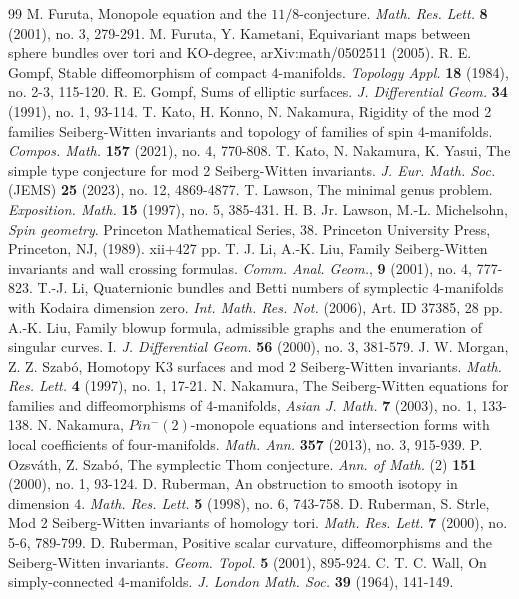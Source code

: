 \documentclass{amsart}
\theoremstyle{definition}
\theoremstyle{remark}
\numberwithin{equation}{section}
\begin{document}
\begin{thebibliography}{99}
M. Furuta, Monopole equation and the $11/8$-conjecture. {\em Math. Res. Lett.} {\bf 8} (2001), no. 3, 279-291. 
M. Furuta, Y. Kametani, Equivariant maps between sphere bundles over tori and KO-degree, arXiv:math/0502511 (2005).
R. E. Gompf, Stable diffeomorphism of compact $4$-manifolds. {\em Topology Appl.} {\bf 18} (1984), no. 2-3, 115-120. 
R. E. Gompf, Sums of elliptic surfaces. {\em J. Differential Geom.} {\bf 34} (1991), no. 1, 93-114. 
T. Kato, H. Konno, N. Nakamura, Rigidity of the mod 2 families Seiberg-Witten invariants and topology of families of spin 4-manifolds. {\em Compos. Math.} {\bf 157} (2021), no. 4, 770-808. 
T. Kato, N. Nakamura, K. Yasui, The simple type conjecture for mod 2 Seiberg-Witten invariants. {\em J. Eur. Math. Soc.} (JEMS) {\bf 25} (2023), no. 12, 4869-4877. 
T. Lawson, The minimal genus problem. {\em Exposition. Math.} {\bf 15} (1997), no. 5, 385-431. 
H. B. Jr. Lawson, M.-L. Michelsohn, {\em Spin geometry}. Princeton Mathematical Series, 38. Princeton University Press, Princeton, NJ, (1989). xii+427 pp.
T. J. Li, A.-K. Liu, Family Seiberg-Witten invariants and wall crossing formulas. {\em Comm. Anal. Geom.}, {\bf 9} (2001), no. 4, 777-823.
T.-J. Li, Quaternionic bundles and Betti numbers of symplectic $4$-manifolds with Kodaira dimension zero. {\em Int. Math. Res. Not.} (2006), Art. ID 37385, 28 pp. 
A.-K. Liu, Family blowup formula, admissible graphs and the enumeration of singular curves. I. {\em J. Differential Geom.} {\bf 56} (2000), no. 3, 381-579. 
J. W. Morgan, Z. Z. Szab\'o, Homotopy K3 surfaces and mod 2 Seiberg-Witten invariants. {\em Math. Res. Lett.} {\bf 4} (1997), no. 1, 17-21. 
N. Nakamura, The Seiberg-Witten equations for families and diffeomorphisms of 4-manifolds, {\em Asian J. Math.} {\bf 7} (2003), no. 1, 133-138.
N. Nakamura, $Pin^-(2)$-monopole equations and intersection forms with local coefficients of four-manifolds. {\em Math. Ann.} {\bf 357} (2013), no. 3, 915-939.
P. Ozsv\'ath, Z. Szab\'o, The symplectic Thom conjecture. {\em Ann. of Math.} (2) {\bf 151} (2000), no. 1, 93-124.
D. Ruberman, An obstruction to smooth isotopy in dimension $4$. {\em Math. Res. Lett.} {\bf 5} (1998), no. 6, 743-758.
D. Ruberman, S. Strle, Mod 2 Seiberg-Witten invariants of homology tori. {\em Math. Res. Lett.} {\bf 7} (2000), no. 5-6, 789-799. 
D. Ruberman, Positive scalar curvature, diffeomorphisms and the Seiberg-Witten invariants. {\em Geom. Topol.} {\bf 5} (2001), 895-924.
C. T. C. Wall, On simply-connected $4$-manifolds. {\em J. London Math. Soc.} {\bf 39} (1964), 141-149. 
\end{thebibliography}
\end{document}
